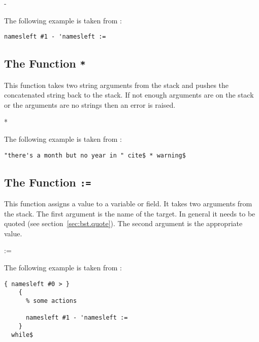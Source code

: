 \begin{BstFunction}{-}
\end{BstFunction}

The following example is taken from :

\begin{lstlisting}[language=bst]
  namesleft #1 - 'namesleft :=
\end{lstlisting}\fctIndex{-}\fctIndex{:=}


\subsection{The Function \texttt{*}}%
\fctIndex{*}

This function takes two string arguments from the stack and pushes the
concatenated string back to the stack. If not enough arguments are on
the stack or the arguments are no strings then an error is raised.

\begin{BstFunction}{*}
\end{BstFunction}

The following example is taken from :

\begin{lstlisting}[language=bst]
  "there's a month but no year in " cite$ * warning$
\end{lstlisting}


\subsection{The Function \texttt{:=}}%
\fctIndex{:=}

This function assigns a value to a variable or field. It takes two
arguments from the stack. The first argument is the name of the
target. In general it needs to be quoted (see
section~\ref{sec:bst.quote}). The second argument is the appropriate
value.

\begin{BstFunction}{:=}
\end{BstFunction}

The following example is taken from :

\begin{lstlisting}[language=bst]
    { namesleft #0 > }
    { 
      % some actions

      namesleft #1 - 'namesleft :=
    }
  while$
\end{lstlisting}\fctIndex{>}\fctIndex{-}\fctIndex{:=}


